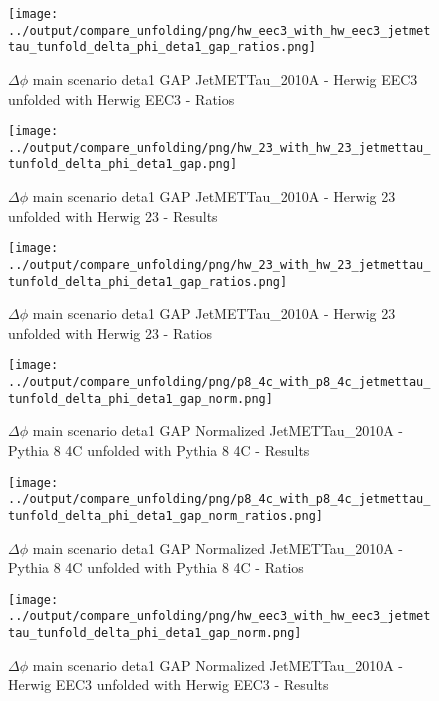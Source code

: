 \documentclass[11pt]{book}
\begin{document}
\begin{figure}[ht]
\centering
\texttt{[image: ../output/compare\_unfolding/png/hw\_eec3\_with\_hw\_eec3\_jetmettau\_tunfold\_delta\_phi\_deta1\_gap\_ratios.png]}
\caption{$\Delta\phi$ main scenario deta1 GAP JetMETTau\_2010A - Herwig EEC3 unfolded with Herwig EEC3 - Ratios}
\label{hw_eec3_hw_eec3_jetmettau_tunfold_delta_phi_deta1_gap_b}
\end{figure}

\begin{figure}[ht]
\centering
\texttt{[image: ../output/compare\_unfolding/png/hw\_23\_with\_hw\_23\_jetmettau\_tunfold\_delta\_phi\_deta1\_gap.png]}
\caption{$\Delta\phi$ main scenario deta1 GAP JetMETTau\_2010A - Herwig 23 unfolded with Herwig 23 - Results}
\label{hw_23_hw_23_jetmettau_tunfold_delta_phi_deta1_gap_a}
\end{figure}

\begin{figure}[ht]
\centering
\texttt{[image: ../output/compare\_unfolding/png/hw\_23\_with\_hw\_23\_jetmettau\_tunfold\_delta\_phi\_deta1\_gap\_ratios.png]}
\caption{$\Delta\phi$ main scenario deta1 GAP JetMETTau\_2010A - Herwig 23 unfolded with Herwig 23 - Ratios}
\label{hw_23_hw_23_jetmettau_tunfold_delta_phi_deta1_gap_b}
\end{figure}


\begin{figure}[ht]
\centering
\texttt{[image: ../output/compare\_unfolding/png/p8\_4c\_with\_p8\_4c\_jetmettau\_tunfold\_delta\_phi\_deta1\_gap\_norm.png]}
\caption{$\Delta\phi$ main scenario deta1 GAP Normalized JetMETTau\_2010A - Pythia 8 4C unfolded with Pythia 8 4C - Results}
\label{p8_p8_jetmettau_tunfold_delta_phi_deta1_gap_norm_a}
\end{figure}

\begin{figure}[ht]
\centering
\texttt{[image: ../output/compare\_unfolding/png/p8\_4c\_with\_p8\_4c\_jetmettau\_tunfold\_delta\_phi\_deta1\_gap\_norm\_ratios.png]}
\caption{$\Delta\phi$ main scenario deta1 GAP Normalized JetMETTau\_2010A - Pythia 8 4C unfolded with Pythia 8 4C - Ratios}
\label{p8_p8_jetmettau_tunfold_delta_phi_deta1_gap_norm_b}
\end{figure}

\begin{figure}[ht]
\centering
\texttt{[image: ../output/compare\_unfolding/png/hw\_eec3\_with\_hw\_eec3\_jetmettau\_tunfold\_delta\_phi\_deta1\_gap\_norm.png]}
\caption{$\Delta\phi$ main scenario deta1 GAP Normalized JetMETTau\_2010A - Herwig EEC3 unfolded with Herwig EEC3 - Results}
\label{hw_eec3_hw_eec3_jetmettau_tunfold_delta_phi_deta1_gap_norm_a}
\end{figure}
\end{document}
